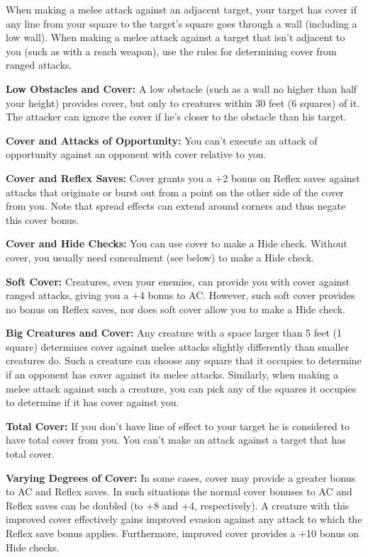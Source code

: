 \documentclass{article}
\begin{document}
When making a melee attack against an adjacent target, your target has cover if 
any line from your square to the target's square goes through a wall (including 
a low wall). When making a melee attack against a target that isn't adjacent to 
you (such as with a reach weapon), use the rules for determining cover from ranged 
attacks.

\textbf{Low Obstacles and Cover:} A low obstacle (such as a wall no higher than 
half your height) provides cover, but only to creatures within 30 feet (6 squares) 
of it. The attacker can ignore the cover if he's closer to the obstacle than his 
target.

\textbf{Cover and Attacks of Opportunity:} You can't execute an attack of opportunity 
against an opponent with cover relative to you.

\textbf{Cover and Reflex Saves:} Cover grants you a +2 bonus on Reflex saves against 
attacks that originate or burst out from a point on the other side of the cover 
from you. Note that spread effects can extend around corners and thus negate this 
cover bonus.

\textbf{Cover and Hide Checks:} You can use cover to make a Hide check. Without 
cover, you usually need concealment (see below) to make a Hide check.

\textbf{Soft Cover:} Creatures, even your enemies, can provide you with cover against 
ranged attacks, giving you a +4 bonus to AC. However, such soft cover provides 
no bonus on Reflex saves, nor does soft cover allow you to make a Hide check.

\textbf{Big Creatures and Cover:} Any creature with a space larger than 5 feet 
(1 square) determines cover against melee attacks slightly differently than smaller 
creatures do. Such a creature can choose any square that it occupies to determine 
if an opponent has cover against its melee attacks. Similarly, when making a melee 
attack against such a creature, you can pick any of the squares it occupies to 
determine if it has cover against you.

\textbf{Total Cover:} If you don't have line of effect to your target he is considered 
to have total cover from you. You can't make an attack against a target that has 
total cover.

\textbf{Varying Degrees of Cover:} In some cases, cover may provide a greater bonus 
to AC and Reflex saves. In such situations the normal cover bonuses to AC and Reflex 
saves can be doubled (to +8 and +4, respectively). A creature with this improved 
cover effectively gains improved evasion against any attack to which the Reflex 
save bonus applies. Furthermore, improved cover provides a +10 bonus on Hide checks.
\end{document}
